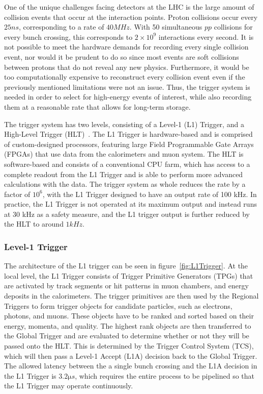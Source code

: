 One of the unique challenges facing detectors at the LHC is the large amount of collision events that occur at the interaction points.
Proton collisions occur every $25\unit{ns}$, corresponding to a rate of $40\unit{MHz}$.
With 50 simultaneous $pp$ collisions for every bunch crossing, this corresponds to $2\times10^9$ interactions every second.
It is not possible to meet the hardware demands for recording every single collision event, nor would it be prudent to do so since most events are soft collisions between protons that do not reveal any new physics.
Furthermore, it would be too computationally expensive to reconstruct every collision event even if the previously mentioned limitations were not an issue.
Thus, the trigger system is needed in order to select for high-energy events of interest, while also recording them at a reasonable rate that allows for long-term storage.

The trigger system has two levels, consisting of a Level-1 (L1) Trigger, and a High-Level Trigger (HLT)~\cite{CMStrigger}.
The L1 Trigger is hardware-based and is comprised of custom-designed processors, featuring large Field Programmable Gate Arrays (FPGAs) that use data from the calorimeters and muon system.
The HLT is software-based and consists of a conventional CPU farm, which has access to a complete readout from the L1 Trigger and is able to perform more advanced calculations with the data.
The trigger system as whole reduces the rate by a factor of $10^6$, with the L1 Trigger designed to have an output rate of 100 kHz.
In practice, the L1 Trigger is not operated at its maximum output and instead runs at 30 kHz as a safety measure, and the L1 trigger output is further reduced by the HLT to around $1\unit{kHz}$.

\subsubsection{Level-1 Trigger}

The architecture of the L1 trigger can be seen in figure~\ref{fig:L1Trigger}.
At the local level, the L1 Trigger consists of Trigger Primitive Generators (TPGs) that are activated by track segments or hit patterns in muon chambers, and energy deposits in the calorimeters.
The trigger primitives are then used by the Regional Triggers to form trigger objects for candidate particles, such as electrons, photons, and muons.
These objects have to be ranked and sorted based on their energy, momenta, and quality.
The highest rank objects are then transferred to the Global Trigger and are evaluated to determine whether or not they will be passed onto the HLT.
This is determined by the Trigger Control System (TCS), which will then pass a Level-1 Accept (L1A) decision back to the Global Trigger.
The allowed latency between the a single bunch crossing and the L1A decision in the L1 Trigger is $3.2\unit{\micro s}$, which requires the entire process to be pipelined so that the L1 Trigger may operate continuously.

